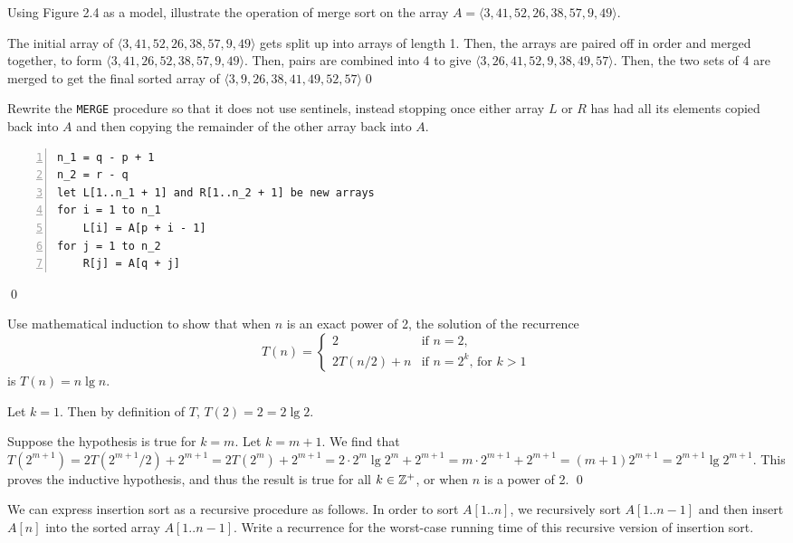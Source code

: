  Using Figure 2.4 as a model, illustrate the operation of merge sort on the array $A = \langle 3, 41, 52, 26, 38, 57, 9, 49 \rangle$.

\sol The initial array of $\langle 3, 41, 52, 26, 38, 57, 9, 49\rangle$ gets split up into arrays of length 1. Then, the arrays are paired off in order and merged together, to form $\langle 3, 41, 26, 52, 38, 57, 9, 49\rangle$. Then, pairs are combined into 4 to give $\langle 3, 26, 41, 52, 9, 38, 49, 57\rangle$. Then, the two sets of 4 are merged to get the final sorted array of $\langle3, 9, 26, 38, 41, 49, 52, 57\rangle$\qed

 Rewrite the \verb|MERGE| procedure so that it does not use sentinels, instead stopping once either array $L$ or $R$ has had all its elements copied back into $A$ and then copying the remainder of the other array back into $A$.

\sol \begin{Verbatim}[frame=single,numbers=left,samepage=true,label={MERGE(A, p, q, r)}]
n_1 = q - p + 1
n_2 = r - q
let L[1..n_1 + 1] and R[1..n_2 + 1] be new arrays
for i = 1 to n_1
    L[i] = A[p + i - 1]
for j = 1 to n_2
    R[j] = A[q + j]

\end{Verbatim}
\qed

 Use mathematical induction to show that when $n$ is an exact power of 2, the solution of the recurrence $$T(n) = \begin{cases} 2 & \text{if } n = 2, \\ 2T(n/2) + n & \text{if } n = 2^k \text{, for } k > 1 \end{cases}$$ is $T(n) = n \lg n$.

\sol Let $k = 1$. Then by definition of $T$, $T(2) = 2 = 2 \lg 2$.

Suppose the hypothesis is true for $k = m$. Let $k = m+1$. We find that $T(2^{m+1}) = 2T(2^{m+1}/2) + 2^{m+1} = 2T(2^m) + 2^{m+1} = 2\cdot 2^m \lg 2^m + 2^{m+1} = m\cdot 2^{m+1} + 2^{m+1} = (m+1)2^{m+1} = 2^{m+1} \lg 2^{m+1}$. This proves the inductive hypothesis, and thus the result is true for all $k \in \mathbb{Z}^+$, or when $n$ is a power of 2. \qed

 We can express insertion sort as a recursive procedure as follows. In order to sort $A[1..n]$, we recursively sort $A[1..n-1]$ and then insert $A[n]$ into the sorted array $A[1..n-1]$. Write a recurrence for the worst-case running time of this recursive version of insertion sort.


